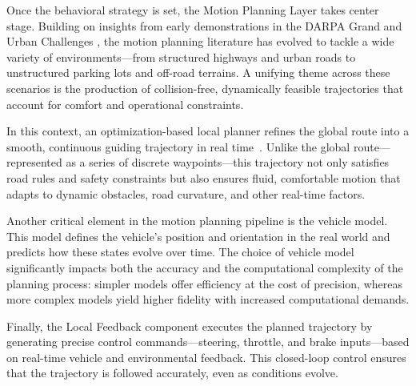 Once the behavioral strategy is set, the Motion Planning Layer takes center stage.
Building on insights from early demonstrations in the DARPA Grand and Urban Challenges \cite{thrun_stanley_2006,montemerlo_junior_2008}, the motion
planning literature has evolved to tackle a wide variety of environments—from structured highways and urban roads to unstructured parking lots and
off-road terrains.
A unifying theme across these scenarios is the production of collision-free, dynamically feasible trajectories that account for comfort and
operational constraints.

In this context, an optimization-based local planner refines the global route into a smooth, continuous guiding trajectory in real
time~\cite{van_hierarchical_2020}.
Unlike the global route—represented as a series of discrete waypoints—this trajectory not only satisfies road rules and safety constraints but also
ensures fluid, comfortable motion that adapts to dynamic obstacles, road curvature, and other real-time factors.

Another critical element in the motion planning pipeline is the vehicle model.
This model defines the vehicle's position and orientation in the real world and predicts how these states evolve over time.
The choice of vehicle model significantly impacts both the accuracy and the computational complexity of the planning process: simpler models offer
efficiency at the cost of precision, whereas more complex models yield higher fidelity with increased computational demands.

Finally, the Local Feedback component executes the planned trajectory by generating precise control commands—steering, throttle, and brake
inputs—based on real-time vehicle and environmental feedback.
This closed-loop control ensures that the trajectory is followed accurately, even as conditions evolve.


